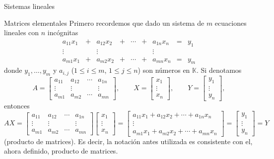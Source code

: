 \documentclass[a4paper,12pt,twoside,spanish]{amsbook}
\theoremstyle{definition}
\theoremstyle{remark}
\newcommand{\K}{\mathbb K}
\begin{document}
\begin{chapter}{Sistemas lineales}
\begin{section}{Matrices elementales}
			Primero recordemos que dado un sistema de $m$  ecuaciones lineales con $n$ incógnitas
			\begin{equation}\label{sist-eq-gen-3}
			\begin{matrix}
			a_{11}x_1& + &a_{12}x_2& + &\cdots& + &a_{1n}x_n &= &y_1\\
			\vdots&  &\vdots& &&  &\vdots \\
			a_{m1}x_1& + &a_{m2}x_2& + &\cdots& + &a_{mn}x_n &=&y_m
			\end{matrix}
			\end{equation}
			donde $y_1, \ldots,y_m$ y $a_{i,j}$ ($1 \le i \le m$, $1 \le j \le n$) son números en $\K$. Si denotamos
			\begin{equation*}
			A = \begin{bmatrix}
			a_{11}& a_{12}& \cdots &a_{1n} \\
			\vdots&\vdots  &  &\vdots \\
			a_{m1} &a_{m2}&\cdots &a_{mn}\end{bmatrix},\qquad
			X = \begin{bmatrix}
			x_1 \\ \vdots \\ x_n 
			\end{bmatrix},
			\qquad 
			Y = \begin{bmatrix}
			y_1 \\ \vdots \\ y_n
			\end{bmatrix},
			\end{equation*}
			entonces 
			\begin{equation*}
			AX = \begin{bmatrix}
			a_{11}& a_{12}& \cdots &a_{1n} \\
			\vdots&\vdots  &  &\vdots \\
			a_{m1} &a_{m2}&\cdots &a_{mn}\end{bmatrix} \begin{bmatrix} 
			x_1 \\ \vdots \\ x_n 
			\end{bmatrix}
			=
			\begin{bmatrix}
			a_{11}x_1+ a_{12}x_2+ \cdots +a_{1n}x_n \\
			\vdots \\
			a_{m1}x_1 +a_{m2}x_2+\cdots +a_{mn}x_n\end{bmatrix} =
			\begin{bmatrix}
			y_1 \\ \vdots \\ y_n
			\end{bmatrix} = Y
			\end{equation*}
			(producto de matrices). Es decir, la notación antes utilizada es consistente con el, ahora definido, producto de matrices.  
			

\end{section}
\end{chapter}
\end{document}
